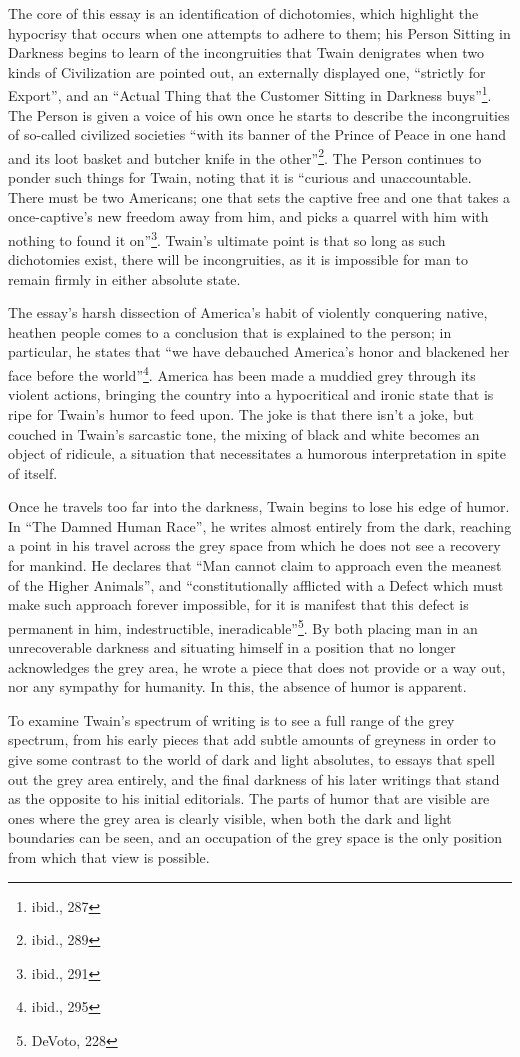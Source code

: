 The core of this essay is an identification of dichotomies, which highlight the
hypocrisy that occurs when one attempts to adhere to them; his Person Sitting in
Darkness begins to learn of the incongruities that Twain denigrates when two
kinds of Civilization are pointed out, an externally displayed one, ``strictly
for Export'', and an ``Actual Thing that the Customer Sitting in Darkness
buys''\footnote{ibid., 287}. The Person is given a voice of his own once he
starts to describe the incongruities of so-called civilized societies ``with its
banner of the Prince of Peace in one hand and its loot basket and butcher knife
in the other''\footnote{ibid., 289}. The Person continues to ponder such things
for Twain, noting that it is ``curious and unaccountable. There must be two
Americans; one that sets the captive free and one that takes a once-captive's
new freedom away from him, and picks a quarrel with him with nothing to found it
on''\footnote{ibid., 291}. Twain's ultimate point is that so long as such
dichotomies exist, there will be incongruities, as it is impossible for man to
remain firmly in either absolute state.

The essay's harsh dissection of America's habit of violently conquering native,
heathen people comes to a conclusion that is explained to the person; in
particular, he states that ``we have debauched America's honor and blackened her
face before the world''\footnote{ibid., 295}. America has been made a muddied
grey through its violent actions, bringing the country into a hypocritical and
ironic state that is ripe for Twain's humor to feed upon. The joke is that there
isn't a joke, but couched in Twain's sarcastic tone, the mixing of black and
white becomes an object of ridicule, a situation that necessitates a humorous
interpretation in spite of itself.

Once he travels too far into the darkness, Twain begins to lose his edge of
humor. In ``The Damned Human Race'', he writes almost entirely from the dark,
reaching a point in his travel across the grey space from which he does not see
a recovery for mankind. He declares that ``Man cannot claim to approach even the
meanest of the Higher Animals'', and ``constitutionally afflicted with a Defect
which must make such approach forever impossible, for it is manifest that this
defect is permanent in him, indestructible, ineradicable''\footnote{DeVoto,
228}. By both placing man in an unrecoverable darkness and situating himself in
a position that no longer acknowledges the grey area, he wrote a piece that does
not provide or a way out, nor any sympathy for humanity. In this, the absence of
humor is apparent.

To examine Twain's spectrum of writing is to see a full range of the grey
spectrum, from his early pieces that add subtle amounts of greyness in order to
give some contrast to the world of dark and light absolutes, to essays that
spell out the grey area entirely, and the final darkness of his later writings
that stand as the opposite to his initial editorials. The parts of humor that
are visible are ones where the grey area is clearly visible, when both the dark
and light boundaries can be seen, and an occupation of the grey space is the
only position from which that view is possible.
